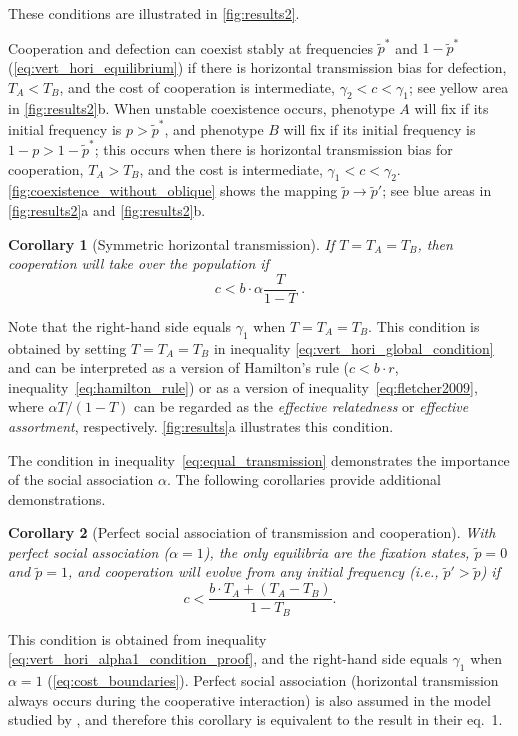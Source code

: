 \documentclass[12pt]{extarticle}
\newtheorem{corollary}{Corollary}
\begin{document}
{These conditions are illustrated in \autoref{fig:results2}.

Cooperation and defection can coexist stably at frequencies $\tilde{p}^*$ and $1-\tilde{p}^*$ (\autoref{eq:vert_hori_equilibrium}) if there is horizontal transmission bias for defection, $T_A<T_B$, and the cost of cooperation is intermediate, $\gamma_2 < c < \gamma_1$; see yellow area in \autoref{fig:results2}b.
When unstable coexistence occurs, phenotype $A$ will fix if its initial frequency is $p>\tilde{p}^*$, and phenotype $B$ will fix if its initial frequency is $1-p>1-\tilde{p}^*$; this occurs when there is horizontal transmission bias for cooperation, $T_A>T_B$, and the cost is intermediate, $\gamma_1 < c < \gamma_2$.
\autoref{fig:coexistence_without_oblique} shows the mapping $\tilde p \to \tilde p'$; see blue areas in \autoref{fig:results2}a and \autoref{fig:results2}b.
\\

\begin{corollary}[Symmetric horizontal transmission] \label{sec:sym_hor_trans}
If $T=T_A=T_B$, then cooperation will take over the population if
\begin{equation}
\label{eq:equal_transmission}
c < b \cdot \alpha \frac{T}{1-T} \;.
\end{equation}
\end{corollary}
Note that the right-hand side equals $\gamma_1$ when $T=T_A=T_B$.
This condition is obtained by setting $T=T_A=T_B$ in inequality \ref{eq:vert_hori_global_condition} and can be interpreted as a version of Hamilton's rule  ($c<b\cdot r$, inequality~\ref{eq:hamilton_rule}) or as a version of inequality~\ref{eq:fletcher2009}, where $\alpha T/(1-T)$ can be regarded as the \emph{effective relatedness} or \emph{effective assortment}, respectively.
\autoref{fig:results}a illustrates this condition. 

The condition in inequality~\ref{eq:equal_transmission} demonstrates the importance of the social association $\alpha$. The following corollaries provide additional demonstrations.
\\

\begin{corollary}[Perfect social association of transmission and cooperation]
With perfect social association ($\alpha=1$), the only equilibria are the fixation states, $\tilde{p}=0$ and $\tilde{p}=1$, and cooperation will evolve from any initial frequency (i.e., $\tilde{p}'>\tilde{p}$) if
\begin{equation}\label{eq:vert_hori_alpha1}
c < \frac{b \cdot T_A + (T_A - T_B)}{1-T_B}.
\end{equation}
\end{corollary}
This condition is obtained from inequality \ref{eq:vert_hori_alpha1_condition_proof}, and the right-hand side equals $\gamma_1$ when $\alpha=1$ (\autoref{eq:cost_boundaries}).
Perfect social association (horizontal transmission always occurs during the cooperative interaction) is also assumed in the model studied by \citet{lewin2017microbes}, and therefore this corollary is equivalent to the result in their eq.~1.

}
\end{document}
